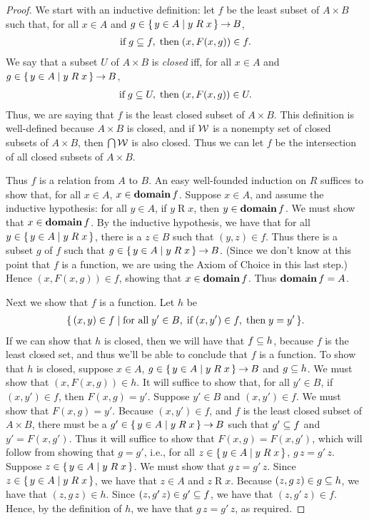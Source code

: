\begin{proof}
We start with an inductive definition:
let $f$ be the least subset of $A\times B$ such that, for
all $x\in A$ and $g\in\{ \, y\in A \mid y\mathrel{R}x \, \}\mathbin{\to} B$,
\begin{gather*}
\allowbreak\mbox{if}\allowbreak\; g\subseteq f, \;\allowbreak\mbox{then}\allowbreak\; (x, F(x, g))\in f .
\end{gather*}
We say that a subset $U$ of $A\times B$ is \emph{closed} iff, for
all $x\in A$ and $g\in\{ \, y\in A \mid y\mathrel{R}x \, \}\mathbin{\to} B$,
\begin{gather*}
\allowbreak\mbox{if}\allowbreak\; g\subseteq U, \;\allowbreak\mbox{then}\allowbreak\; (x, F(x, g))\in U .
\end{gather*}
Thus, we are saying that $f$ is the least closed subset of
$A\times B$.
This definition is well-defined because $A\times B$ is closed,
and if $\cal W$ is a nonempty set of closed subsets
of $A\times B$, then $\bigcap\cal W$ is also closed.
Thus we can let $f$ be the intersection of
all closed subsets of $A\times B$.

Thus $f$ is a relation from $A$ to $B$.  An easy well-founded
induction on $R$ suffices to show that, for all $x\in A$,
$x\in\mathbf{domain}\,f$.  Suppose $x\in A$, and assume the inductive
hypothesis: for all $y\in A$, if $y\mathrel{R}x$, then $y\in\mathbf{domain}\,f$.
We must show that $x\in\mathbf{domain}\,f$.  By the inductive hypothesis,
we have that for all $y\in\{ \, y\in A \mid y\mathrel{R}x \, \}$,
there is a $z\in B$ such that $(y,z)\in f$.  Thus there
is a subset $g$ of $f$ such that $g\in\{ \, y\in A \mid y\mathrel{R}x \, \}\mathbin{\to} B$.
(Since we don't know at this point that $f$ is a function, we
are using the Axiom of Choice in this last step.)
Hence $(x,F(x,g))\in f$, showing that $x\in\mathbf{domain}\,f$.
Thus $\mathbf{domain}\,f=A$.

Next we show that $f$ is a function.  Let $h$ be
\begin{gather*}
\{ \, (x,y)\in f \mid \allowbreak\mbox{for all}\allowbreak\;y'\in B,\;\allowbreak\mbox{if}\allowbreak\;(x,y')\in f,
\;\allowbreak\mbox{then}\allowbreak\; y = y' \, \} .
\end{gather*}
If we can show that $h$ is closed, then we will have that $f\subseteq h$,
because $f$ is the least closed set, and thus we'll be able to
conclude that $f$ is a function.  To show that $h$ is closed, suppose
$x\in A$, $g\in\{ \, y\in A \mid y\mathrel{R}x \, \}\mathbin{\to} B$ and $g\subseteq h$.  We
must show that $(x, F(x, g))\in h$.  It will suffice to show that, for
all $y'\in B$, if $(x,y')\in f$, then $F(x, g) = y'$.  Suppose $y'\in
B$ and $(x,y')\in f$.  We must show that $F(x, g) = y'$.  Because
$(x,y')\in f$, and $f$ is the least closed subset of $A\times B$,
there must be a $g'\in \{ \, y\in
  A \mid y\mathrel{R}x \, \}\mathbin{\to} B$ such that $g'\subseteq f$ and $y'=F(x, g')$.
Thus it will suffice to show that $F(x,g) = F(x, g')$, which will follow
from showing that $g=g'$, i.e., for all $z\in\{ \, y\in
  A \mid y\mathrel{R}x \, \}$, $g\,z=g'\,z$.  Suppose $z\in\{ \, y\in
  A \mid y\mathrel{R}x \, \}$.  We must show that $g\,z=g'\,z$.  Since
$z\in\{ \, y\in A \mid y\mathrel{R}x \, \}$, we have that $z\in A$ and
$z\mathrel{R}x$.  Because $(z,g\,z)\in g\subseteq h$, we have that
$(z,g\,z)\in h$.  Since $(z,g'\,z)\in g'\subseteq f$, we have that
$(z,g'\,z)\in f$.  Hence, by the definition of $h$, we have that
$g\,z=g'\,z$, as required.


\end{proof}
